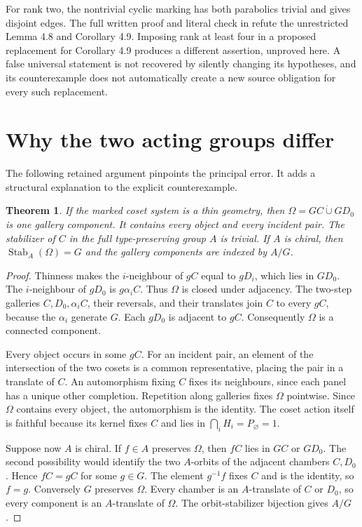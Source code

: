 \documentclass[11pt]{article}
\newtheorem{theorem}{Theorem}[section]
\begin{document}
For rank two, the nontrivial cyclic marking has both parabolics
trivial and gives disjoint edges. The full written proof and
literal check in \cite{PB} refute the unrestricted Lemma 4.8
and Corollary 4.9. Imposing rank at least four in a proposed
replacement for Corollary 4.9 produces a different assertion,
unproved here. A false universal statement is not recovered
by silently changing its hypotheses, and its counterexample
does not automatically create a new source obligation for
every such replacement.

\section{Why the two acting groups differ}
The following retained argument pinpoints the principal error.
It adds a structural explanation to the explicit counterexample.

\begin{theorem}\label{component}
If the marked coset system is a thin geometry, then
$\Omega=GC\mathbin{\dot\cup}GD_0$ is one gallery component.
It contains every object and every incident pair. The stabilizer
of $C$ in the full type-preserving group $A$ is trivial.
If $A$ is chiral, then $\operatorname{Stab}_A(\Omega)=G$ and
the gallery components are indexed by $A/G$.
\end{theorem}
\begin{proof}
Thinness makes the $i$-neighbour of $gC$ equal to $gD_i$,
which lies in $GD_0$. The $i$-neighbour of $gD_0$ is
$g\alpha_iC$. Thus $\Omega$ is closed under adjacency.
The two-step galleries $C,D_0,\alpha_iC$, their reversals,
and their translates join $C$ to every $gC$, because the
$\alpha_i$ generate $G$. Each $gD_0$ is adjacent to $gC$.
Consequently $\Omega$ is a connected component.

Every object occurs in some $gC$. For an incident pair,
an element of the intersection of the two cosets is a common
representative, placing the pair in a translate of $C$.
An automorphism fixing $C$ fixes its neighbours, since each
panel has a unique other completion. Repetition along galleries
fixes $\Omega$ pointwise. Since $\Omega$ contains every object,
the automorphism is the identity. The coset action itself is
faithful because its kernel fixes $C$ and lies in
$\bigcap_iH_i=P_\varnothing=1$.

Suppose now $A$ is chiral. If $f\in A$ preserves $\Omega$,
then $fC$ lies in $GC$ or $GD_0$. The second possibility would
identify the two $A$-orbits of the adjacent chambers $C,D_0$.
Hence $fC=gC$ for some $g\in G$. The element $g^{-1}f$
fixes $C$ and is the identity, so $f=g$. Conversely $G$
preserves $\Omega$. Every chamber is an $A$-translate of
$C$ or $D_0$, so every component is an $A$-translate of
$\Omega$. The orbit-stabilizer bijection gives $A/G$.
\end{proof}
\end{document}
